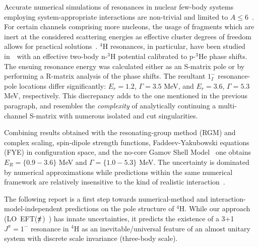 \documentclass[5p,times]{elsarticle}
\newcommand{\eftnopi}{\mbox{EFT($\slashed{\pi}$) }}
\begin{document}
Accurate numerical simulations of resonances in nuclear few-body systems employing system-appropriate interactions are
non-trivial and limited to $A\leq6$~\cite{Li:2019pmg,Lazauskas:2019cxj}.  
For certain channels comprising more nucleons, the usage of fragments which are inert at the considered scattering energies
as effective cluster degrees of freedom allows for practical solutions~\cite{Arai:2003ek,deDiego:2007rd}.
$^4$H resonances, in particular, have been studied in~\cite{deDiego:2007rd}~with an effective two-body n-$^3$H
potential calibrated to p-$^3$He phase shifts. 
The ensuing resonance energy was calculated either as an S-matrix pole or by performing a R-matrix analysis of the phase shifts.
The resultant $1^-_I$ resonance-pole locations differ significantly: 
$E_r=1.2$, $\Gamma=3.5$ MeV, and $E_r=3.6$, $\Gamma=5.3$ MeV, respectively. This discrepancy adds to the one mentioned in the previous
paragraph, and resembles the {\it complexity} of analytically continuing a multi-channel S-matrix with numerous isolated and
cut singularities.
%
%

%
Combining results obtained with the resonating-group method (RGM) and
complex scaling, spin-dipole strength functions, 
Faddeev-Yakubowski equations (FYE) in configuration space, and the
no-core Gamov Shell Model~\cite{Arai:2003ek,Horiuchi:2013iw,Lazauskas:2019cxj,Li:2021ado}
one obtains $E_R=\{0.9-3.6\}$ MeV and $\Gamma=\{1.0-5.3\}$ MeV. The uncertainty is dominated
by numerical approximations while predictions within the same numerical framework are relatively
insensitive to the kind of realistic interaction~\cite{Lazauskas:2019cxj,Li:2021ado}.
%
%

The following report is a first step towards numerical-method and interaction-model-independent 
predictions on the pole structure of $^4$H. While our approach (LO~\eftnopi) has innate uncertainties,
it predicts the existence of a 3+1 $J^{\pi}=1^-$ resonance in $^4$H as an inevitable/universal feature of an almost
unitary system with discrete scale invariance (three-body scale). 

\end{document}

